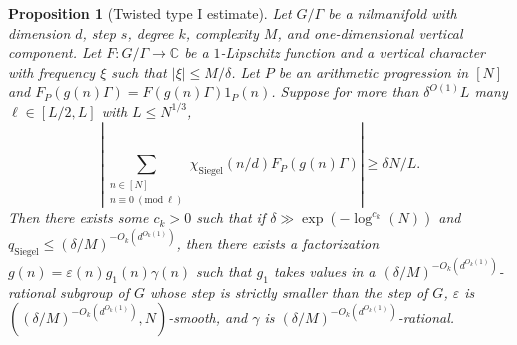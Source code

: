 \documentclass[11pt, a4paper]{amsart}
\newcommand{\nmod}[1]{~(\mathrm{mod}~#1)}
\theoremstyle{plain}
\theoremstyle{plain}
\newtheorem{proposition}{Proposition}
\theoremstyle{definition}
\theoremstyle{remark}
\numberwithin{equation}{section}
\numberwithin{lemma}{section}
\numberwithin{proposition}{section}
\numberwithin{corollary}{section}
\numberwithin{definition}{section}
\numberwithin{claim}{section}
\begin{document}
\begin{proposition}[Twisted type I estimate]\label{p:twistedtype1}
Let $G/\Gamma$ be a nilmanifold with dimension $d$, step $s$, degree $k$, complexity $M$, and one-dimensional vertical component. Let $F\colon G/\Gamma \to \mathbb{C}$ be a $1$-Lipschitz function and a vertical character with frequency $\xi$ such that $|\xi| \le M/\delta$. Let $P$ be an arithmetic progression in $[N]$ and $F_P(g(n)\Gamma) = F(g(n)\Gamma)1_P(n)$. Suppose for more than $\delta^{O(1)}L$ many $\ell \in [L/2, L]$ with $L \le N^{1/3}$,
\begin{equation}\label{e:maintwistedtype1inequality}
\left|\sum_{\substack{n \in [N]\\ n \equiv 0 \nmod{\ell}}}  \chi_{\mathrm{Siegel}}(n/d)F_P(g(n)\Gamma)\right| \ge \delta N/L.    
\end{equation}
Then there exists some $c_k > 0$ such that if $\delta \gg \exp(-\log^{c_k}(N))$ and $q_{\mathrm{Siegel}} \le (\delta/M)^{-O_k(d^{O_k(1)})}$, then there exists a factorization $g(n) = \varepsilon(n)g_1(n)\gamma(n)$ such that $g_1$ takes values in a $(\delta/M)^{-O_k(d^{O_k(1)})}$-rational subgroup of $G$ whose step is strictly smaller than the step of $G$, $\varepsilon$ is $((\delta/M)^{-O_k(d^{O_k(1)})}, N)$-smooth, and $\gamma$ is $(\delta/M)^{-O_k(d^{O_k(1)})}$-rational.
\end{proposition}
\end{document}
